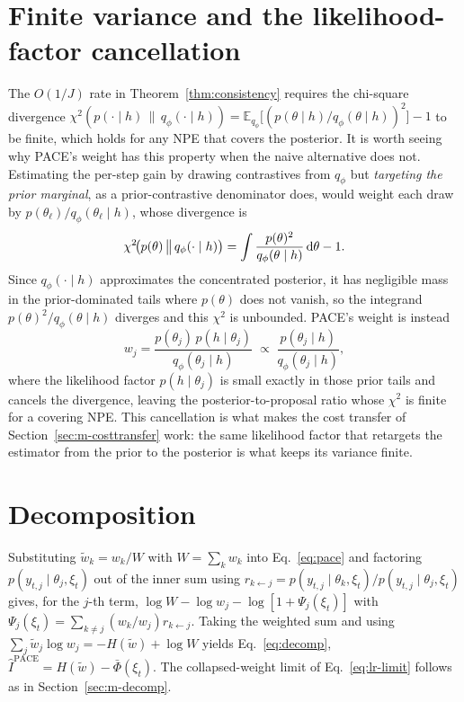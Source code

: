 \section{Finite variance and the likelihood-factor cancellation}
\label{app:chi2}
The $O(1/J)$ rate in Theorem~\ref{thm:consistency} requires the chi-square divergence
$\chi^2(p(\cdot\mid h)\,\|\,q_\phi(\cdot\mid h))=\mathbb{E}_{q_\phi}\!\big[(p(\theta\mid h)/q_\phi(\theta\mid h))^2\big]-1$
to be finite, which holds for any NPE that covers the posterior. It is worth seeing why
PACE's weight has this property when the naive alternative does not. Estimating the
per-step gain by drawing contrastives from $q_\phi$ but \emph{targeting the prior
marginal}, as a prior-contrastive denominator does, would weight each draw by
$p(\theta_\ell)/q_\phi(\theta_\ell\mid h)$, whose divergence is
\begin{equation}
\label{eq:chi2-prior}
\chi^2\!\big(p(\theta)\,\big\|\,q_\phi(\cdot\mid h)\big)=\int\frac{p(\theta)^2}{q_\phi(\theta\mid h)}\,\mathrm{d}\theta-1 .
\end{equation}
Since $q_\phi(\cdot\mid h)$ approximates the concentrated posterior, it has negligible
mass in the prior-dominated tails where $p(\theta)$ does not vanish, so the integrand
$p(\theta)^2/q_\phi(\theta\mid h)$ diverges and this $\chi^2$ is unbounded. PACE's weight
is instead
\[
w_j=\frac{p(\theta_j)\,p(h\mid\theta_j)}{q_\phi(\theta_j\mid h)}\;\propto\;\frac{p(\theta_j\mid h)}{q_\phi(\theta_j\mid h)} ,
\]
where the likelihood factor $p(h\mid\theta_j)$ is small exactly in those prior tails and
cancels the divergence, leaving the posterior-to-proposal ratio whose $\chi^2$ is finite
for a covering NPE. This cancellation is what makes the cost transfer of
Section~\ref{sec:m-costtransfer} work: the same likelihood factor that retargets the
estimator from the prior to the posterior is what keeps its variance finite.

\section{Decomposition}
Substituting $\tilde w_k=w_k/W$ with $W=\sum_k w_k$ into Eq.~\eqref{eq:pace} and
factoring $p(y_{t,j}\mid\theta_j,\xi_t)$ out of the inner sum using
$r_{k\leftarrow j}=p(y_{t,j}\mid\theta_k,\xi_t)/p(y_{t,j}\mid\theta_j,\xi_t)$ gives,
for the $j$-th term, $\log W-\log w_j-\log[1+\Psi_j(\xi_t)]$ with
$\Psi_j(\xi_t)=\sum_{k\ne j}(w_k/w_j)r_{k\leftarrow j}$. Taking the weighted sum and
using $\sum_j\tilde w_j\log w_j=-H(\tilde w)+\log W$ yields Eq.~\eqref{eq:decomp},
$\hat I^{\mathrm{PACE}}=H(\tilde w)-\bar\Phi(\xi_t)$. The collapsed-weight limit of
Eq.~\eqref{eq:lr-limit} follows as in Section~\ref{sec:m-decomp}.

